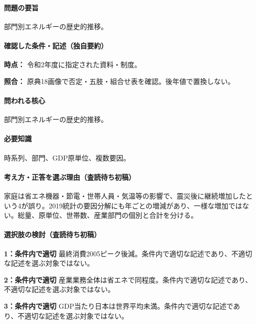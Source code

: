 \paragraph{問題の要旨} 部門別エネルギーの歴史的推移。

\paragraph{確認した条件・記述（独自要約）}\mbox{}\par

\noindent\textbf{時点：} 令和2年度に指定された資料・制度。\par

\noindent\textbf{照合：} 原典18画像で否定・五肢・組合せ表を確認。後年値で置換しない。\par

\paragraph{問われる核心} 部門別エネルギーの歴史的推移。

\paragraph{必要知識} 時系列、部門、GDP原単位、複数要因。

\paragraph{考え方・正答を選ぶ理由（査読待ち初稿）} 家庭は省エネ機器・節電・世帯人員・気温等の影響で、震災後に継続増加したという4が誤り。2019統計の要因分解にも年ごとの増減があり、一様な増加ではない。総量、原単位、世帯数、産業部門の個別と合計を分ける。

\paragraph{選択肢の検討（査読待ち初稿）}\mbox{}\par

\noindent\textbf{1：条件内で適切} 最終消費2005ピーク後減。条件内で適切な記述であり、不適切な記述を選ぶ対象ではない。\par

\noindent\textbf{2：条件内で適切} 産業業務全体は省エネで同程度。条件内で適切な記述であり、不適切な記述を選ぶ対象ではない。\par

\noindent\textbf{3：条件内で適切} GDP当たり日本は世界平均未満。条件内で適切な記述であり、不適切な記述を選ぶ対象ではない。\par

